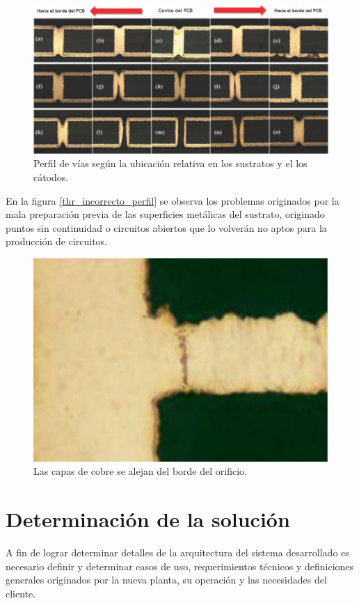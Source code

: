 \begin{figure}[h]
	\centering
	\includegraphics[width=.9\textwidth]{Figures/Cap_2/through_hole_perfil_fallado}
	\caption{Perfil de vías según la ubicación relativa en los sustratos y el los cátodos.}
	\label{fig:thr_incorrecto_perfil}
\end{figure}

En la figura \ref{thr_incorrecto_perfil} se observa los problemas originados por la mala preparación previa de las superficies metálicas del sustrato, originado puntos sin continuidad o circuitos abiertos que lo volverán no aptos para la producción de circuitos.

\begin{figure}[h]
	\centering
	\includegraphics[width=.5\textwidth]{Figures/Cap_2/etchback_thr_incorrecto_perfil}
	\caption{ Las capas de cobre se alejan del borde del orificio.}
	\label{fig:thr_incorrecto_perfil}
\end{figure}

\section{ Determinación de la solución } 

A fin de lograr determinar detalles de la arquitectura del sistema desarrollado es necesario definir y determinar casos de uso, requerimientos técnicos y definiciones generales originados por la nueva planta, su operación y las necesidades del cliente. 

